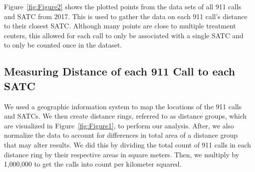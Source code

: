 \documentclass[12pt]{article}
\begin{document}
Figure~\ref{fig:Figure2} shows the plotted points from the data sets of all 911 calls and SATC from 2017. This is used to gather the data on each 911 call's distance to their closest SATC. Although many points are close to multiple treatment centers, this allowed for each call to only be associated with a single SATC and to only be counted once in the dataset. 



\subsection{Measuring Distance of each 911 Call to each SATC}
 

 We used a geographic information system to map the locations of the 911 calls and SATCs. We then create distance rings, referred to as distance groups, which are visualized in Figure~\ref{fig:Figure1}, to perform our analysis. After, we also normalize the data to account for differences in total area of a distance group that may alter results. We did this by dividing the total count of 911 calls in each distance ring by their respective areas in square meters. Then, we multiply by 1,000,000 to get the calls into count per kilometer squared.
\end{document}
